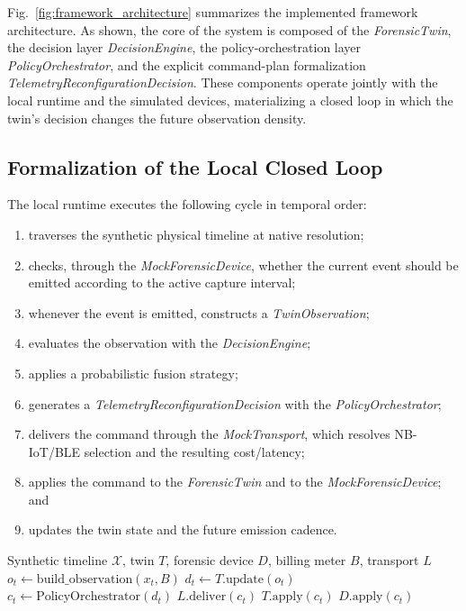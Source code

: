\documentclass{ieeeaccess}
\begin{document}
Fig.~\ref{fig:framework_architecture} summarizes the implemented framework architecture. As shown, the core of the system is composed of the \textit{ForensicTwin}, the decision layer \textit{DecisionEngine}, the policy-orchestration layer \textit{PolicyOrchestrator}, and the explicit command-plan formalization \textit{TelemetryReconfigurationDecision}. These components operate jointly with the local runtime and the simulated devices, materializing a closed loop in which the twin's decision changes the future observation density.

\subsection{Formalization of the Local Closed Loop}
\label{subsec:Local_Closed_Loop}
The local runtime executes the following cycle in temporal order:
\begin{enumerate}
    \item traverses the synthetic physical timeline at native resolution;
    \item checks, through the \textit{MockForensicDevice}, whether the current event should be emitted according to the active capture interval;
    \item whenever the event is emitted, constructs a \textit{TwinObservation};
    \item evaluates the observation with the \textit{DecisionEngine};
    \item applies a probabilistic fusion strategy;
    \item generates a \textit{TelemetryReconfigurationDecision} with the \textit{PolicyOrchestrator};
    \item delivers the command through the \textit{MockTransport}, which resolves NB-IoT/BLE selection and the resulting cost/latency;
    \item applies the command to the \textit{ForensicTwin} and to the \textit{MockForensicDevice}; and
    \item updates the twin state and the future emission cadence.
\end{enumerate}

\begin{algorithm}[!ht]
\caption{Local closed loop of the digital twin}
\label{alg:closed_loop_twin}
\begin{algorithmic}[1]
\REQUIRE Synthetic timeline $\mathcal{X}$, twin $T$, forensic device $D$, billing meter $B$, transport $L$
        \STATE $o_t \gets \text{build\_observation}(x_t, B)$
        \STATE $d_t \gets T.\text{update}(o_t)$
        \STATE $c_t \gets \text{PolicyOrchestrator}(d_t)$
        \STATE $L.\text{deliver}(c_t)$
        \STATE $T.\text{apply}(c_t)$
        \STATE $D.\text{apply}(c_t)$
    \ENDIF
\ENDFOR
\end{algorithmic}
\end{algorithm}
\end{document}
